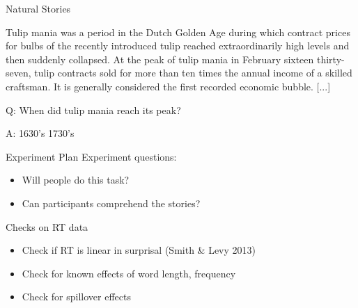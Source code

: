 \documentclass[12pt, xcolor=beamer,table,usenames,dvipsnames, ignorenonframetext, ngerman]{beamer}
\begin{document}
\begin{frame}{Natural Stories}

\begin{small}Tulip mania was a period in the Dutch Golden Age during which contract prices for bulbs of the recently introduced tulip reached extraordinarily high levels and then suddenly collapsed. At the peak of tulip mania in February sixteen thirty-seven, tulip contracts sold for more than ten times the annual income of a skilled craftsman. It is generally considered the first recorded economic bubble. [...]
\medskip

Q: When did tulip mania reach its peak?

A: \hspace{3em} 1630's\hspace{3em} 1730's \end{small}

\end{frame}

\begin{frame}{Experiment Plan}
Experiment questions:
\begin{itemize}
	\item Will people do this task?
	\item Can participants comprehend the stories?
\end{itemize}

\pause

\medskip
 
Checks on RT data
\begin{itemize}
	\item Check if RT is linear in surprisal (Smith \& Levy 2013)
	\item Check for known effects of word length, frequency
	\item Check for spillover effects
\end{itemize}

\end{frame}
\end{document}

